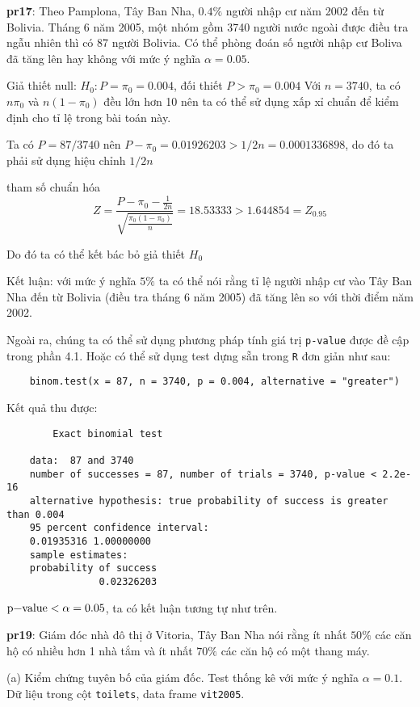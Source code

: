 \textbf{pr17}: Theo Pamplona, Tây Ban Nha, $0.4\%$ người nhập cư năm 2002 đến từ Bolivia.
Tháng 6 năm 2005, một nhóm gồm 3740 người nước ngoài được điều tra ngẫu nhiên thì có 87 người 
Bolivia. Có thể phòng đoán số người nhập cư Boliva đã tăng lên hay không với mức ý nghĩa $\alpha = 0.05$.

Giả thiết null: $H_0: P = \pi_0 = 0.004$, đối thiết $P > \pi_0 = 0.004$
Với $n = 3740$, ta có $n\pi_0$ và $n(1 - \pi_0)$ đều lớn hơn 10 nên ta có thể sử dụng xấp xỉ chuẩn 
để kiểm định cho tỉ lệ trong bài toán này.

Ta có $P = 87/3740$ nên $P - \pi_0 = 0.01926203 > 1/2n = 0.0001336898$, do đó ta phải sử dụng hiệu chỉnh $1/2n$

tham số chuẩn hóa 
$$Z = \frac{P - \pi_0 - \frac{1}{2n}}{\sqrt{\frac{\pi_0(1 - \pi_0)}{n}}} = 18.53333 > 1.644854 = Z_{0.95}$$

Do đó ta có thể kết bác bỏ giả thiết $H_0$

Kết luận: với mức ý nghĩa $5\%$ ta có thể nói rằng tỉ lệ người nhập cư vào Tây Ban Nha đến từ Bolivia (điều tra tháng 6 năm 2005)
đã tăng lên so với thời điểm năm 2002.

Ngoài ra, chúng ta có thể sử dụng phương pháp tính giá trị \lstinline{p-value} được đề cập trong phần 4.1.
Hoặc có thể sử dụng test dựng sẵn trong \lstinline{R} đơn giản như sau:

\begin{lstlisting}
    binom.test(x = 87, n = 3740, p = 0.004, alternative = "greater")
\end{lstlisting}

Kết quả thu được:

\begin{lstlisting}
        Exact binomial test

    data:  87 and 3740
    number of successes = 87, number of trials = 3740, p-value < 2.2e-16
    alternative hypothesis: true probability of success is greater than 0.004
    95 percent confidence interval:
    0.01935316 1.00000000
    sample estimates:
    probability of success 
                0.02326203 
\end{lstlisting}

$\text{\lstinline{p-value}} < \alpha = 0.05$, ta có kết luận tương tự như trên.

\textbf{pr19}: Giám đóc nhà đô thị ở Vitoria, Tây Ban Nha nói rằng ít nhất $50\%$
các căn hộ có nhiều hơn 1 nhà tắm và ít nhất $70\%$ các căn hộ có một thang máy.

(a) Kiểm chứng tuyên bố của giám đốc. Test thống kê với mức ý nghĩa $\alpha = 0.1$. 
Dữ liệu trong cột \lstinline{toilets}, data frame \lstinline{vit2005}.

